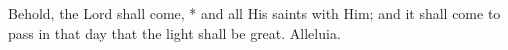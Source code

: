 Behold, the Lord shall come, * and all His saints with Him; and it shall come to pass in that day that the light shall be great. Alleluia.
